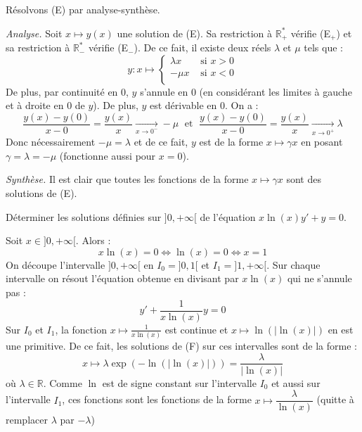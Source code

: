 \documentclass[a4paper,10pt]{report}
\begin{document}
\medskip

\noindent Résolvons (E) par analyse-synthèse.

\medskip

\noindent \textit{Analyse.} Soit $x \mapsto y(x)$ une solution de (E). Sa restriction à $\mathbb R_+^*$ vérifie (E$_+$) et sa restriction à $\mathbb R_-^*$ vérifie (E$_-$). De ce fait, il existe deux réels $\lambda$ et $\mu$ tels que :
$$y : x\mapsto \left\{\begin{array}{ll} \lambda x & \text{ si } x > 0 \\-\mu x & \text{ si } x < 0 \\ \end{array}\right.$$
De plus, par continuité en $0$, $y$ s'annule en $0$ (en considérant les limites à gauche et à droite en $0$ de $y$).
De plus, $y$ est dérivable en $0$. On a :
$$\dfrac{y(x)-y(0)}{x-0} = \dfrac{y(x)}{x} \underset{x\to0^-}{\longrightarrow} -\mu \; \text{ et } \; \dfrac{y(x)-y(0)}{x-0} = \dfrac{y(x)}{x} \underset{x\to0^+}{\longrightarrow} \lambda $$
Donc nécessairement $-\mu = \lambda $ et de ce fait, $y$ est de la forme $x \mapsto \gamma x$ en posant $\gamma = \lambda  = -\mu$ (fonctionne aussi pour $x=0$).

\medskip

\noindent \textit{Synthèse.} Il est clair que toutes les fonctions de la forme $x \mapsto \gamma x$ sont des solutions de (E). 

\begin{Exercice}{} Déterminer les solutions définies sur $]0,+\infty[$ de l'équation 
$ x \ln(x)y'+ y = 0$.
\end{Exercice}

\corr Soit $x \in ]0,+\infty[$. Alors :
$$x \ln(x) = 0 \iff \ln(x) = 0 \iff x = 1$$
On découpe l'intervalle $]0,+\infty[$ en $I_0 = ]0,1[$ et $I_1 = ]1,+\infty[$. Sur chaque intervalle on résout l'équation obtenue en divisant par $x\ln(x)$ qui ne s'annule pas :
\begin{equation}
\tag{F}
y' + \dfrac{1}{x\ln (x)} y= 0
\end{equation}
Sur $I_0$ et $I_1$, la fonction $x \mapsto \frac{1}{x\ln(x)}$ est continue et $x \mapsto \ln(|\ln (x)|)$ en est une primitive. De ce fait, les solutions de (F) sur ces intervalles sont de la forme :
$$x \mapsto \lambda \exp(-\ln(|\ln (x)|)) = \frac{\lambda}{|\ln (x)|}$$
où $\lambda \in \mathbb{R}$. Comme $\ln$ est de signe constant sur l'intervalle $I_0$ et aussi sur l'intervalle $I_1$, ces fonctions sont les fonctions de la forme $x \mapsto \dfrac{\lambda}{\ln (x)}$ (quitte à remplacer $\lambda$ par $-\lambda$)
\end{document}
